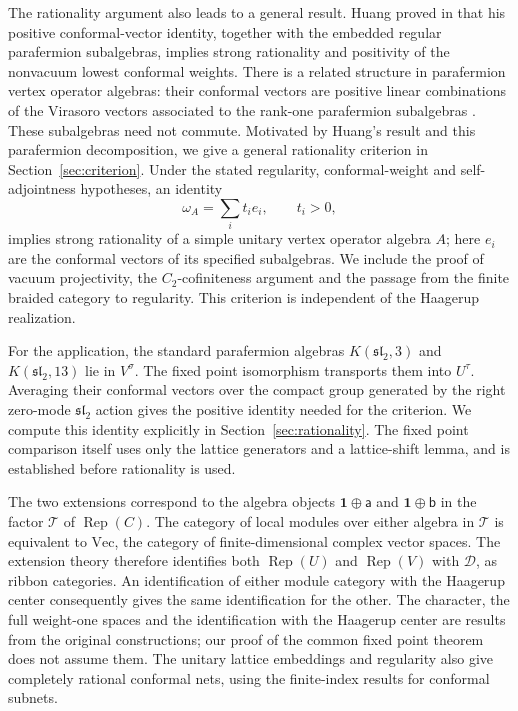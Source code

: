 \documentclass[11pt,reqno]{amsart}
\theoremstyle{definition}\newtheorem{definition}[theorem]{Definition}
\theoremstyle{remark}\newtheorem{remark}[theorem]{Remark}
\newcommand{\one}{\mathbf1}\newcommand{\slc}{\mathfrak{sl}_2}
\newcommand{\Rep}{\operatorname{Rep}}
\newcommand{\Tc}{\mathcal T}\newcommand{\D}{\mathcal D}
\numberwithin{equation}{section}
\begin{document}
The rationality argument also leads to a general result. Huang proved in \cite[Section 4, Proposition 3]{Huang} that his positive conformal-vector identity, together with the embedded regular parafermion subalgebras, implies strong rationality and positivity of the nonvacuum lowest conformal weights. There is a related structure in parafermion vertex operator algebras: their conformal vectors are positive linear combinations of the Virasoro vectors associated to the rank-one parafermion subalgebras \cite[Sections 2--3]{DW}. These subalgebras need not commute. Motivated by Huang's result and this parafermion decomposition, we give a general rationality criterion in Section~\ref{sec:criterion}. Under the stated regularity, conformal-weight and self-adjointness hypotheses, an identity
\[
 \omega_A=\sum_i t_i e_i,\qquad t_i>0,
\]
implies strong rationality of a simple unitary vertex operator algebra $A$; here $e_i$ are the conformal vectors of its specified subalgebras. We include the proof of vacuum projectivity, the $C_2$-cofiniteness argument and the passage from the finite braided category to regularity. This criterion is independent of the Haagerup realization.

For the application, the standard parafermion algebras $K(\slc,3)$ and $K(\slc,13)$ lie in $V^\sigma$. The fixed point isomorphism transports them into $U^\tau$. Averaging their conformal vectors over the compact group generated by the right zero-mode $\slc$ action gives the positive identity needed for the criterion. We compute this identity explicitly in Section~\ref{sec:rationality}. The fixed point comparison itself uses only the lattice generators and a lattice-shift lemma, and is established before rationality is used.

{The two extensions correspond to the algebra objects $\one\oplus\mathsf a$ and $\one\oplus\mathsf b$ in the factor $\Tc$ of $\Rep(C)$. The category of local modules over either algebra in $\Tc$ is equivalent to $\mathrm{Vec}$, the category of finite-dimensional complex vector spaces. The extension theory therefore identifies both $\Rep(U)$ and $\Rep(V)$ with $\D$, as ribbon categories.} An identification of either module category with the Haagerup center consequently gives the same identification for the other. The character, the full weight-one spaces and the identification with the Haagerup center are results from the original constructions; our proof of the common fixed point theorem does not assume them. The unitary lattice embeddings and regularity also give completely rational conformal nets, using the finite-index results for conformal subnets.
\end{document}
